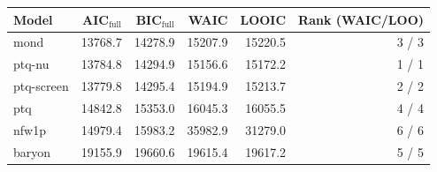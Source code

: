 \begin{tabular}{lrrrrr}
\toprule
Model & AIC$_{\mathrm{full}}$ & BIC$_{\mathrm{full}}$ & WAIC & LOOIC & Rank (WAIC/LOO) \\
\midrule
mond & 13768.7 & 14278.9 & 15207.9 & 15220.5 & 3 / 3 \\
ptq-nu & 13784.8 & 14294.9 & 15156.6 & 15172.2 & 1 / 1 \\
ptq-screen & 13779.8 & 14295.4 & 15194.9 & 15213.7 & 2 / 2 \\
ptq & 14842.8 & 15353.0 & 16045.3 & 16055.5 & 4 / 4 \\
nfw1p & 14979.4 & 15983.2 & 35982.9 & 31279.0 & 6 / 6 \\
baryon & 19155.9 & 19660.6 & 19615.4 & 19617.2 & 5 / 5 \\
\bottomrule
\end{tabular}